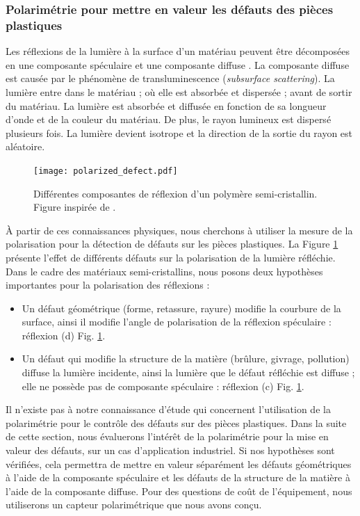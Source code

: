 \subsubsection{Polarimétrie pour mettre en valeur les défauts des pièces plastiques}
Les réflexions de la lumière à la surface d'un matériau peuvent être décomposées en une composante spéculaire et une composante diffuse \cite{hanrahan_reflection_1993}.
La composante diffuse est causée par le phénomène de transluminescence (\textit{subsurface scattering}).
La lumière entre dans le matériau ; où elle est absorbée et dispersée ; avant de sortir du matériau.
La lumière est absorbée et diffusée en fonction de sa longueur d'onde et de la couleur du matériau.
De plus, le rayon lumineux est dispersé plusieurs fois.
La lumière devient isotrope et la direction de la sortie du rayon est aléatoire.

\begin{figure}[tbhp]
	\centering
	\texttt{[image: polarized\_defect.pdf]}
	\caption{Différentes composantes de réflexion d'un polymère semi-cristallin. Figure inspirée de \cite{debevec_acquiring_2000}.}
	\label{fig:polarized_defect}
\end{figure}

À partir de ces connaissances physiques, nous cherchons à utiliser la mesure de la polarisation pour la détection de défauts sur les pièces plastiques.
La Figure \ref{fig:polarized_defect} présente l'effet de différents défauts sur la polarisation de la lumière réfléchie.
Dans le cadre des matériaux semi-cristallins, nous posons deux hypothèses importantes pour la polarisation des réflexions :
\begin{itemize}
	\item Un défaut géométrique (forme, retassure, rayure)  modifie la courbure de la surface, ainsi il modifie l'angle de polarisation de la réflexion spéculaire : réflexion (d) Fig. \ref{fig:polarized_defect}.
	\item Un défaut qui modifie la structure de la matière (brûlure, givrage, pollution) diffuse la lumière incidente, ainsi la lumière que le défaut réfléchie est diffuse ; elle ne possède pas de composante spéculaire : réflexion (c) Fig. \ref{fig:polarized_defect}.
\end{itemize}
Il n'existe pas à notre connaissance d'étude qui concernent l'utilisation de la polarimétrie pour le contrôle des défauts sur des pièces plastiques.
Dans la suite de cette section, nous évaluerons l'intérêt de la polarimétrie pour la mise en valeur des défauts, sur un cas d'application industriel.
Si nos hypothèses sont vérifiées, cela permettra de mettre en valeur séparément les défauts géométriques à l'aide de la composante spéculaire et les défauts de la structure de la matière à l'aide de la composante diffuse.
Pour des questions de coût de l'équipement, nous utiliserons un capteur polarimétrique que nous avons conçu.

